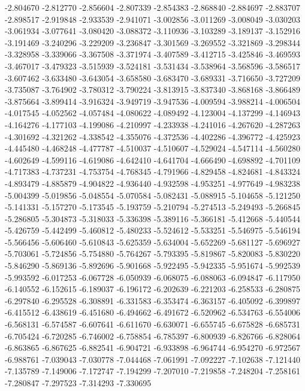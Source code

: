-2.804670
-2.812770
-2.856604
-2.807339
-2.854383
-2.868840
-2.884697
-2.883707
-2.898517
-2.919848
-2.933539
-2.941071
-3.002856
-3.011269
-3.008049
-3.030203
-3.061934
-3.077641
-3.080420
-3.088372
-3.110936
-3.103289
-3.189137
-3.152916
-3.191469
-3.240296
-3.229209
-3.236847
-3.301569
-3.269552
-3.321869
-3.298344
-3.328958
-3.339066
-3.367508
-3.371974
-3.407589
-3.412715
-3.425846
-3.469593
-3.467017
-3.479323
-3.515939
-3.524181
-3.531434
-3.538964
-3.568596
-3.586517
-3.607462
-3.633480
-3.643054
-3.658580
-3.683470
-3.689331
-3.716650
-3.727209
-3.735087
-3.764902
-3.780312
-3.790224
-3.813915
-3.837340
-3.868168
-3.866489
-3.875664
-3.899414
-3.916324
-3.949719
-3.947536
-4.009594
-3.988214
-4.006504
-4.017545
-4.052562
-4.057484
-4.080622
-4.089492
-4.123004
-4.137299
-4.146943
-4.164276
-4.177103
-4.199086
-4.210997
-4.233938
-4.241016
-4.267620
-4.287263
-4.301692
-4.321262
-4.338542
-4.355076
-4.372536
-4.402286
-4.396772
-4.425923
-4.445480
-4.468248
-4.477787
-4.510037
-4.510607
-4.529024
-4.547114
-4.560280
-4.602649
-4.599116
-4.619086
-4.642410
-4.641704
-4.666490
-4.698892
-4.701109
-4.717383
-4.737231
-4.753754
-4.768345
-4.791966
-4.829458
-4.824681
-4.843324
-4.893479
-4.885879
-4.904822
-4.936440
-4.932598
-4.953251
-4.977649
-4.983238
-5.004399
-5.019856
-5.048554
-5.070584
-5.082431
-5.088915
-5.104658
-5.121250
-5.141331
-5.157270
-5.173545
-5.193759
-5.210794
-5.274513
-5.249493
-5.266845
-5.286805
-5.304873
-5.318033
-5.336398
-5.389116
-5.366181
-5.412668
-5.440544
-5.426759
-5.442499
-5.460812
-5.480233
-5.524612
-5.533251
-5.546975
-5.546194
-5.566456
-5.606460
-5.610843
-5.625359
-5.634004
-5.652269
-5.681127
-5.696927
-5.703061
-5.724856
-5.754880
-5.764267
-5.793395
-5.819867
-5.820083
-5.830220
-5.846290
-5.869136
-5.892696
-5.901668
-5.922495
-5.942335
-5.951674
-5.992539
-5.993592
-6.017253
-6.067728
-6.050939
-6.068075
-6.088063
-6.094847
-6.117950
-6.140552
-6.152615
-6.189037
-6.196172
-6.202639
-6.221203
-6.258533
-6.280875
-6.297840
-6.295528
-6.308891
-6.331583
-6.353474
-6.363157
-6.405092
-6.399897
-6.415512
-6.438619
-6.451680
-6.494662
-6.491672
-6.520962
-6.534763
-6.554006
-6.568131
-6.574587
-6.607641
-6.611670
-6.630071
-6.655745
-6.675828
-6.685731
-6.705424
-6.720285
-6.746002
-6.758854
-6.785397
-6.800939
-6.826766
-6.828064
-6.863865
-6.867625
-6.882541
-6.904721
-6.933898
-6.964744
-6.954270
-6.972567
-6.988761
-7.039043
-7.030778
-7.044468
-7.061991
-7.092227
-7.102638
-7.121440
-7.135789
-7.149006
-7.172747
-7.194299
-7.207010
-7.219858
-7.248204
-7.258161
-7.280847
-7.297523
-7.314293
-7.330695
